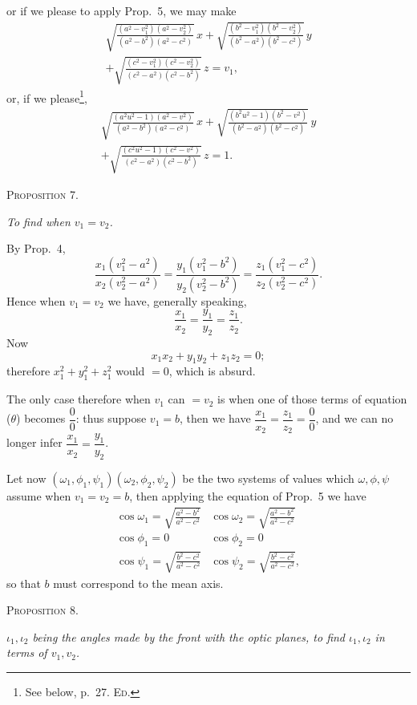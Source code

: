 \documentclass[11pt]{article}
\newcommand{\proposition}[1]{\vspace{0.9em}\begin{center}{\scshape Proposition #1.}\end{center}\vspace{0.2em}}
\newcommand{\sourcepage}[1]{\marginpar{\scriptsize p.~#1}}
\newcommand{\tagtext}[1]{\tag{#1}}
\begin{document}
\sourcepage{7}
or if we please to apply Prop.~5, we may make
\begin{multline*}
\sqrt{\frac{(a^2-v_1^2)(a^2-v_2^2)}{(a^2-b^2)(a^2-c^2)}}\,x
+\sqrt{\frac{(b^2-v_1^2)(b^2-v_2^2)}{(b^2-a^2)(b^2-c^2)}}\,y\\
+\sqrt{\frac{(c^2-v_1^2)(c^2-v_2^2)}{(c^2-a^2)(c^2-b^2)}}\,z=v_1,
\end{multline*}
or, if we please\footnote{See below, p.~27. \textsc{Ed.}},
\begin{multline*}
\sqrt{\frac{(a^2u^2-1)(a^2-v^2)}{(a^2-b^2)(a^2-c^2)}}\,x
+\sqrt{\frac{(b^2u^2-1)(b^2-v^2)}{(b^2-a^2)(b^2-c^2)}}\,y\\
+\sqrt{\frac{(c^2u^2-1)(c^2-v^2)}{(c^2-a^2)(c^2-b^2)}}\,z=1.
\end{multline*}

\proposition{7}

\emph{To find when $v_1=v_2$.}

By Prop.~4,
\begin{equation}
 \frac{x_1(v_1^2-a^2)}{x_2(v_2^2-a^2)}
=\frac{y_1(v_1^2-b^2)}{y_2(v_2^2-b^2)}
=\frac{z_1(v_1^2-c^2)}{z_2(v_2^2-c^2)}. \tagtext{$\theta$}
\end{equation}
Hence when $v_1=v_2$ we have, generally speaking,
\[
 \frac{x_1}{x_2}=\frac{y_1}{y_2}=\frac{z_1}{z_2}.
\]
Now
\[
 x_1x_2+y_1y_2+z_1z_2=0;
\]
therefore $x_1^2+y_1^2+z_1^2$ would $=0$, which is absurd.

The only case therefore when $v_1$ can $=v_2$ is when one of those terms of equation ($\theta$) becomes $\dfrac{0}{0}$: thus suppose $v_1=b$, then we have $\dfrac{x_1}{x_2}=\dfrac{z_1}{z_2}=\dfrac{0}{0}$, and we can no longer infer $\dfrac{x_1}{x_2}=\dfrac{y_1}{y_2}$.

Let now $(\omega_1,\phi_1,\psi_1)(\omega_2,\phi_2,\psi_2)$ be the two systems of values which $\omega,\phi,\psi$ assume when $v_1=v_2=b$, then applying the equation of Prop.~5 we have
\[
\begin{array}{cc}
\displaystyle \cos\omega_1=\sqrt{\frac{a^2-b^2}{a^2-c^2}} &
\displaystyle \cos\omega_2=\sqrt{\frac{a^2-b^2}{a^2-c^2}}\\[1.0em]
\cos\phi_1=0 & \cos\phi_2=0\\[1.0em]
\displaystyle \cos\psi_1=\sqrt{\frac{b^2-c^2}{a^2-c^2}} &
\displaystyle \cos\psi_2=\sqrt{\frac{b^2-c^2}{a^2-c^2}},
\end{array}
\]
so that $b$ must correspond to the mean axis.

\sourcepage{8}
\proposition{8}

\emph{$\iota_1,\iota_2$ being the angles made by the front with the optic planes, to find $\iota_1,\iota_2$ in terms of $v_1,v_2$.}
\end{document}
